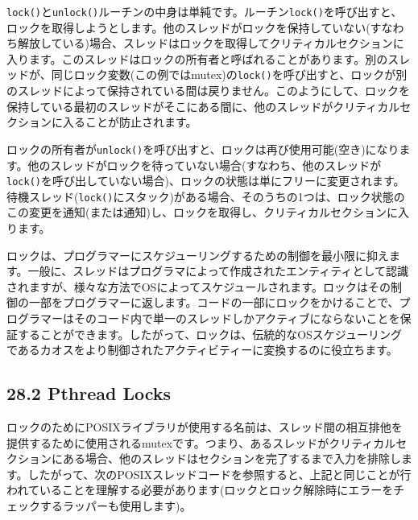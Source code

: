\texttt{lock()}と\texttt{unlock()}ルーチンの中身は単純です。ルーチン\texttt{lock()}を呼び出すと、ロックを取得しようとします。他のスレッドがロックを保持していない(すなわち解放している)場合、スレッドはロックを取得してクリティカルセクションに入ります。このスレッドはロックの所有者と呼ばれることがあります。別のスレッドが、同じロック変数(この例ではmutex)の\texttt{lock()}を呼び出すと、ロックが別のスレッドによって保持されている間は戻りません。このようにして、ロックを保持している最初のスレッドがそこにある間に、他のスレッドがクリティカルセクションに入ることが防止されます。

ロックの所有者が\texttt{unlock()}を呼び出すと、ロックは再び使用可能(空き)になります。他のスレッドがロックを待っていない場合(すなわち、他のスレッドが\texttt{lock()}を呼び出していない場合)、ロックの状態は単にフリーに変更されます。待機スレッド(\texttt{lock()}にスタック)がある場合、そのうちの1つは、ロック状態のこの変更を通知(または通知)し、ロックを取得し、クリティカルセクションに入ります。

ロックは、プログラマーにスケジューリングするための制御を最小限に抑えます。一般に、スレッドはプログラマによって作成されたエンティティとして認識されますが、様々な方法でOSによってスケジュールされます。ロックはその制御の一部をプログラマーに返します。コードの一部にロックをかけることで、プログラマーはそのコード内で単一のスレッドしかアクティブにならないことを保証することができます。したがって、ロックは、伝統的なOSスケジューリングであるカオスをより制御されたアクティビティーに変換するのに役立ちます。

\hypertarget{pthread-locks}{%
\subsection*{28.2 Pthread Locks}\label{pthread-locks}}

ロックのためにPOSIXライブラリが使用する名前は、スレッド間の相互排他を提供するために使用されるmutexです。つまり、あるスレッドがクリティカルセクションにある場合、他のスレッドはセクションを完了するまで入力を排除します。したがって、次のPOSIXスレッドコードを参照すると、上記と同じことが行われていることを理解する必要があります(ロックとロック解除時にエラーをチェックするラッパーも使用します)。

\begin{Shaded}
\begin{Highlighting}[]
\NormalTok{;}
\end{Highlighting}
\end{Shaded}

